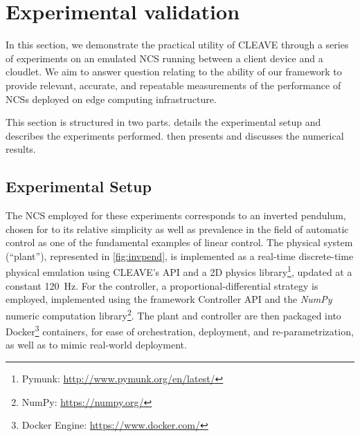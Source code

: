 \section{Experimental validation}\label{sec:experiments}




In this section, we demonstrate the practical utility of \ac{CLEAVE} through a series of experiments on an emulated \ac{NCS} running between a client device and a cloudlet.
We aim to answer question relating to the ability of our framework to provide relevant, accurate, and repeatable measurements of the performance of \acp{NCS} deployed on edge computing infrastructure.

This section is structured in two parts.
 details the experimental setup and describes the experiments performed.
 then presents and discusses the numerical results.

\subsection{Experimental Setup}\label{ssec:expsetup}

The \acl{NCS} employed for these experiments corresponds to an inverted pendulum, chosen for to its relative simplicity as well as prevalence in the field of automatic control as one of the fundamental examples of linear control.
The physical system (``plant''), represented in \cref{fig:invpend}, is implemented as a real-time discrete-time physical emulation using CLEAVE's API and a 2D physics library\footnote{Pymunk: \url{http://www.pymunk.org/en/latest/}}, updated at a constant \SI{120}{\hertz}.
For the controller, a proportional-differential strategy is employed, implemented using the framework Controller API and the \emph{NumPy} numeric computation library\footnote{NumPy: \url{https://numpy.org/}}.
The plant and controller are then packaged into Docker\footnote{Docker Engine: \url{https://www.docker.com/}} containers, for ease of orchestration, deployment, and re-parametrization, as well as to mimic real-world deployment.

